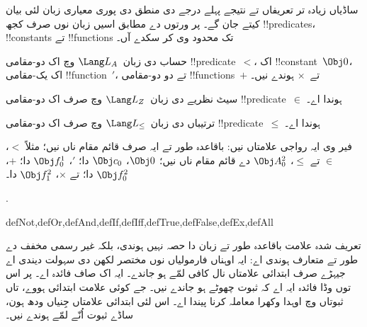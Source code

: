 \documentclass[../../../include/open-logic-section]{subfiles}
\begin{document}
ساڈیاں زیادہ تر تعریفاں تے نتیجے پہلے درجے دی منطق دی پوری
معیاری زبان لئی بیان کیتے جان گے۔ پر ورتوں دے مطابق اسیں
زبان نوں صرف کجھ !!{predicate}s، !!{constant}s تے
!!{function}s تک محدود وی کر سکدے آں۔

\begin{ex}
حساب دی زبان~$\Lang L_A$ وچ اک دو-مقامی !!{predicate}~$<$،
اک !!{constant}~$\Obj 0$، اک یک-مقامی !!{function}~$\prime$،
تے دو دو-مقامی !!{function}s~$+$ تے~$\times$ ہوندے نیں۔
\end{ex}

\begin{ex}
سیٹ نظریے دی زبان~$\Lang L_Z$ وچ صرف اک دو-مقامی
!!{predicate}~$\in$ ہوندا اے۔
\end{ex}

\begin{ex}
ترتیباں دی زبان~$\Lang L_\le$ وچ صرف اک دو-مقامی
!!{predicate}~$\le$ ہوندا اے۔
\end{ex}

فیر وی ایہ رواجی علامتاں نیں: باقاعدہ طور تے ایہ صرف قائم مقام ناں نیں؛
مثلاً $<$، $\in$ تے $\le$، $\Obj A^2_0$ دے قائم مقام ناں نیں؛
$\Obj 0$، $\Obj c_0$ دا؛ $\prime$، $\Obj f^1_0$ دا؛
$+$، $\Obj f^2_0$ دا؛ تے $\times$، $\Obj f^2_1$ دا۔

.

\begin{tagblock}{defNot,defOr,defAnd,defIf,defIff,defTrue,defFalse,defEx,defAll}
\begin{explain}
تعریف شدہ علامت باقاعدہ طور تے زبان دا حصہ نہیں ہوندی،
بلکہ غیر رسمی مخفف دے طور تے متعارف ہوندی اے: ایہ
اوہناں فارمولیاں نوں مختصر لکھن دی سہولت دیندی اے
جیہڑے صرف ابتدائی علامتاں نال کافی لمّے ہو جاندے۔
ایہ اک صاف فائدہ اے۔ پر اس توں وڈا فائدہ ایہ اے کہ ثبوت
چھوٹے ہو جاندے نیں۔ جے کوئی علامت ابتدائی ہووے، تاں
ثبوتاں وچ اوہدا وکھرا معاملہ کرنا پیندا اے۔ اس لئی
ابتدائی علامتاں جِنیاں ودھ ہون، ساڈے ثبوت اُنّے لمّے ہوندے نیں۔
\end{explain}
\end{tagblock}
\end{document}
